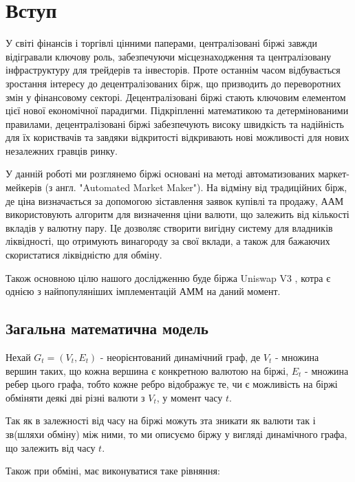 \documentclass[a4paper, 11pt]{article}
\newcommand{\tqs}{\textquotesingle}
\begin{document}
\newpage

\section{Вступ}
\label{sec:intro}

У світі фінансів і торгівлі цінними паперами, централізовані біржі завжди
відігравали ключову роль, забезпечуючи місцезнаходження та централізовану
інфраструктуру для трейдерів та інвесторів. Проте останнім часом відбувається
зростання інтересу до децентралізованих бірж, що призводить до переворотних
змін у фінансовому секторі. Децентралізовані біржі стають ключовим елементом
цієї нової економічної парадигми. Підкріпленні математикою та детермінованими
правилами, децентралізовані біржі забезпечують високу швидкість та надійність
для їх користвачів та завдяки відкритості відкривають нові можливості для нових
незалежних гравців ринку.

У данній роботі ми розглянемо біржі основані на методі автоматизованих
маркет-мейкерів (з англ. "Automated Market Maker"). На відміну від традиційних
бірж, де ціна визначається за допомогою зіставлення заявок купівлі та продажу,
ААМ використовують алгоритм для визначення ціни валюти, що залежить від
кількості вкладів у валютну пару. Це дозволяє створити вигідну систему для
владників ліквідності, що отримують винагороду за свої вклади, а також для
бажаючих скористатися ліквідністю для обміну.

Також основною цілю нашого дослідженню буде біржа Uniswap V3 \cite{adams2021uniswap},
котра є однією з найпопуляніших імплементацій АММ на даний момент.

\subsection{Загальна математична модель}
\label{sec:orgeec742e}
\label{sec:math-model}

Нехай \(G_{t} = (V_{t}, E_{t})\) - неорієнтований динамічний граф, де \(V_{t}\) -
множина вершин таких, що кожна вершина є конкретною валютою на біржі,
\(E_{t}\) - множина ребер цього графа, тобто кожне ребро відображує те, чи є
можливість на біржі обміняти деякі дві різні валюти з \(V_{t}\), у момент часу
\(t\).

Так як в залежності від часу на біржі можуть з та зникати як валюти так
і зв (шляхи обміну) між ними, то ми описуємо біржу у вигляді динамічного
графа, що залежить від часу \(t\).

Також при обміні, має виконуватися таке рівняння:
\end{document}
